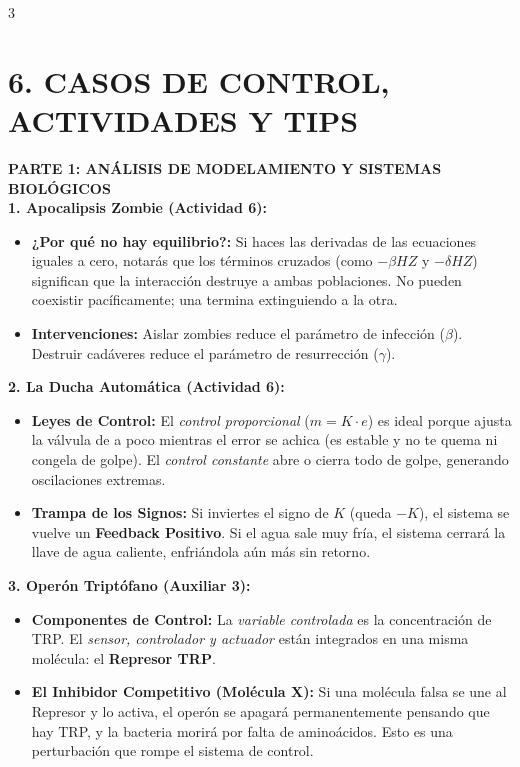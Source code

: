 \documentclass[9pt,landscape,letterpaper]{extarticle}
\begin{document}
\begin{multicols*}{3}
	\section{6. CASOS DE CONTROL, ACTIVIDADES Y TIPS}

	\begin{tcolorbox}[colback=tipsbg,colframe=tipsframe,boxrule=1pt,arc=3pt,left=3pt,right=3pt,top=3pt,bottom=3pt]
		\textbf{\color{myblue} PARTE 1: ANÁLISIS DE MODELAMIENTO Y SISTEMAS BIOLÓGICOS}\\
		\textbf{1. Apocalipsis Zombie (Actividad 6):}
		\begin{itemize}
			\item \textbf{¿Por qué no hay equilibrio?:} Si haces las derivadas de las ecuaciones iguales a cero, notarás que los términos cruzados (como $-\beta H Z$ y $-\delta H Z$) significan que la interacción destruye a ambas poblaciones. No pueden coexistir pacíficamente; una termina extinguiendo a la otra.
			\item \textbf{Intervenciones:} Aislar zombies reduce el parámetro de infección ($\beta$). Destruir cadáveres reduce el parámetro de resurrección ($\gamma$).
		\end{itemize}

		\textbf{2. La Ducha Automática (Actividad 6):}
		\begin{itemize}
			\item \textbf{Leyes de Control:} El \textit{control proporcional} ($m = K \cdot e$) es ideal porque ajusta la válvula de a poco mientras el error se achica (es estable y no te quema ni congela de golpe). El \textit{control constante} abre o cierra todo de golpe, generando oscilaciones extremas.
			\item \textbf{Trampa de los Signos:} Si inviertes el signo de $K$ (queda $-K$), el sistema se vuelve un \textbf{Feedback Positivo}. Si el agua sale muy fría, el sistema cerrará la llave de agua caliente, enfriándola aún más sin retorno.
		\end{itemize}

		\textbf{3. Operón Triptófano (Auxiliar 3):}
		\begin{itemize}
			\item \textbf{Componentes de Control:} La \textit{variable controlada} es la concentración de TRP. El \textit{sensor, controlador y actuador} están integrados en una misma molécula: el \textbf{Represor TRP}.
			\item \textbf{El Inhibidor Competitivo (Molécula X):} Si una molécula falsa se une al Represor y lo activa, el operón se apagará permanentemente pensando que hay TRP, y la bacteria morirá por falta de aminoácidos. Esto es una perturbación que rompe el sistema de control.
		\end{itemize}
	\end{tcolorbox}


\end{multicols*}
\end{document}

